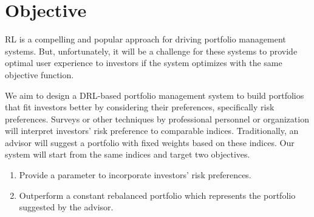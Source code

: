 \section{Objective}
RL is a compelling and popular approach for driving portfolio management systems. But, unfortunately, it will be a challenge for these systems to provide optimal user experience to investors if the system optimizes with the same objective function.

We aim to design a DRL-based portfolio management system to build portfolios that fit investors better by considering their preferences, specifically risk preferences. Surveys or other techniques by professional personnel or organization will interpret investors' risk preference to comparable indices. Traditionally, an advisor will suggest a portfolio with fixed weights based on these indices.
Our system will start from the same indices and target two objectives.
\begin{enumerate}
    \item  Provide a parameter to incorporate investors' risk preferences.
    \item Outperform a constant rebalanced portfolio which represents the portfolio suggested by the advisor. 
\end{enumerate}

